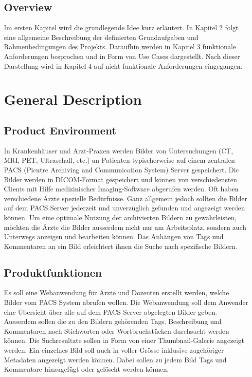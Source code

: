 \documentclass[a4paper,draftmode]{srs}
\begin{document}
\subsection{Overview}
Im ersten Kapitel wird die grundlegende Idee kurz erläutert. In Kapitel 2 folgt eine allgemeine Beschreibung der definierten Grundaufgaben und Rahmenbedingungen des Projekts. Daraufhin werden in Kapitel 3 funktionale Anforderungen besprochen und in Form von Use Cases dargestellt. Nach dieser Darstellung wird in Kapitel 4 auf nicht-funktionale Anforderungen eingegangen.

	\section{General Description}

\subsection{Product Environment}
In Krankenhäuser und Arzt-Praxen werden Bilder von Untersuchungen (CT, MRI, PET, Ultraschall, etc.) an Patienten typischerweise auf einem zentralen PACS (Picutre Archiving and Communication System) Server gespeichert. Die Bilder werden in DICOM-Format gespeichert und können von verschiedensten Clients mit Hilfe medizinischer Imaging-Software abgerufen werden. Oft haben verschiedene Ärzte spezielle Bedürfnisse. Ganz allgemein jedoch sollten die Bilder auf dem PACS Server jederzeit und unverzüglich gefunden und angezeigt werden können. Um eine optimale Nutzung der archivierten Bildern zu gewährleisten, möchten die Ärzte die Bilder ausserdem nicht nur am Arbeitsplatz, sondern auch Unterwegs anzeigen und bearbeiten können. Das Anhängen von Tags und Kommentaren an ein Bild erleichtert ihnen die Suche nach spezifische Bildern.

\subsection{Produktfunktionen}
Es soll eine Webanwendung für Ärzte und Dozenten erstellt werden, welche Bilder vom PACS System abrufen wollen. 
Die Webanwendung soll dem Anwender eine Übersicht über alle auf dem PACS Server abgelegten Bilder geben. Ausserdem sollen die zu den Bildern gehörenden Tags, Beschreibung und Kommentaren nach Stichworten oder Wortbruchstücken durchsucht werden können. Die Suchresultate sollen in Form von einer Thumbnail-Galerie angezeigt werden. Ein einzelnes Bild soll auch in voller Grösse inklusive zugehöriger Metadaten angezeigt werden können. Dabei sollen zu jedem Bild Tags und Kommentare hinzugefügt oder gelöscht werden können.
\end{document}
